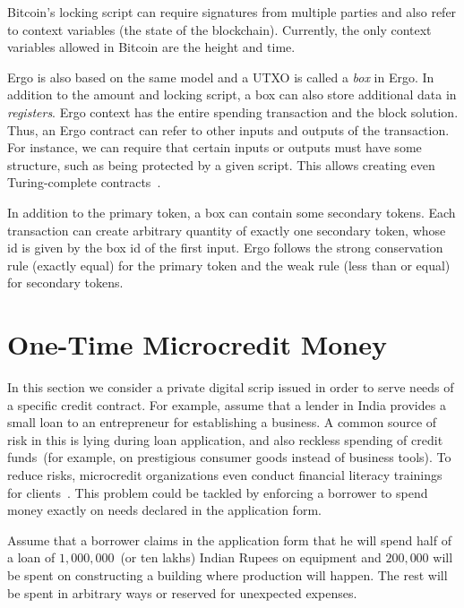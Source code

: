 \documentclass[]{llncs}   %
\begin{document}
Bitcoin's locking script can require signatures from multiple parties and also refer to context variables (the state of the blockchain). Currently, the only context variables allowed in Bitcoin are the height and time. 

Ergo is also based on the same model and a UTXO is called a {\em box} in Ergo. In addition to the amount and locking script, a box can also store additional data in {\em registers}. Ergo context has the entire spending transaction and the block solution. Thus, an Ergo contract can refer to other inputs and outputs of the transaction. For instance, we can require that certain inputs or outputs must have some structure, such as being protected by a given script. This allows creating even Turing-complete contracts~\cite{chepurnoy2018self}. 

In addition to the primary token, a box can contain some secondary tokens.
Each transaction can create arbitrary quantity of exactly one secondary token, whose id is given by the box id of the first input. Ergo follows the strong conservation rule (exactly equal) for the primary token and the weak rule (less than or equal) for secondary tokens. 

\section{One-Time Microcredit Money}
\label{sec-microcredit}

 In this section we consider a private digital scrip issued in order to serve needs of a specific credit contract.
 For example, assume that a lender in India provides a small loan to an entrepreneur for establishing a business.
 A common source of risk in this is lying during loan application, and also reckless spending of credit funds~(for example, on prestigious consumer goods instead of business tools). To reduce risks, microcredit
 organizations even conduct financial literacy trainings for clients~\cite{finliteracy}. This problem could be tackled by enforcing a borrower to spend money exactly on needs declared in the application form.  

 Assume that a borrower claims in the application form that he will spend half of a loan of $1,000,000$~(or ten lakhs) 
 Indian Rupees on equipment and $200,000$ will be spent on constructing a building where production will happen. The rest will be spent in arbitrary ways or reserved for unexpected expenses.
\end{document}
